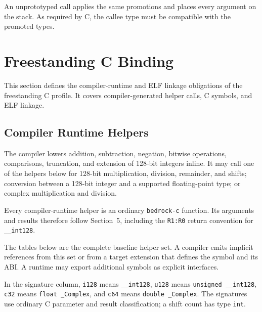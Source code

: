 \documentclass[10pt,twoside]{article}
\begin{document}
An unprototyped call applies the same promotions and places every argument on
the stack. As required by C, the callee type must be compatible with the
promoted types.

\section{Freestanding C Binding}\label{page:freestanding-c-binding}
This section defines the compiler-runtime and ELF linkage obligations of the
freestanding C profile. It covers compiler-generated helper calls, C symbols,
and ELF linkage.

\subsection{Compiler Runtime Helpers}
The compiler lowers addition, subtraction, negation, bitwise operations,
comparisons, truncation, and extension of 128-bit integers inline. It may call
one of the helpers below for 128-bit multiplication,
division, remainder, and shifts; conversion between a 128-bit integer and a
supported floating-point type; or complex multiplication and division.

Every compiler-runtime helper is an ordinary \texttt{bedrock-c} function. Its
arguments and results therefore follow Section~5, including the
\texttt{R1:R0} return convention for \texttt{\_\_int128}.

The tables below are the complete baseline helper set. A compiler emits
implicit references from this set or from a target extension that defines the
symbol and its ABI. A runtime may export additional symbols as explicit
interfaces.

In the signature column, \texttt{i128} means \texttt{\_\_int128},
\texttt{u128} means \texttt{unsigned \_\_int128}, \texttt{c32} means
\texttt{float \_Complex}, and \texttt{c64} means
\texttt{double \_Complex}. The signatures use ordinary C parameter and result
classification; a shift count has type \texttt{int}.
\end{document}
